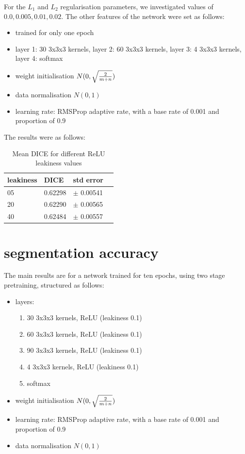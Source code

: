 \documentclass[msc]{infthesis}
\begin{document}
For the \(L_1\) and \(L_2\) regularisation parameters, we investigated values of \(0.0, 0.005, 0.01, 0.02\).
The other features of the network were set as follows:
\begin{itemize}
\item trained for only one epoch
\item layer 1: 30 3x3x3 kernels, layer 2: 60 3x3x3 kernels, layer 3: 4 3x3x3 kernels, layer 4: softmax
\item weight initialisation \(N(0, \sqrt{2 \over m + n})\)
\item data normalisation \(N(0, 1)\)
\item learning rate: RMSProp adaptive rate, with a base rate of 0.001 and proportion of 0.9
\end{itemize}
The results were as follows:
\begin{table}[ht]
  \centering
  \begin{tabular}[c]{llll}
    leakiness & DICE & std error \\
    \hline
    05 & 0.62298 & \(\pm\) 0.00541  \\
    20 & 0.62290 & \(\pm\) 0.00565  \\
    40 & 0.62484 & \(\pm\) 0.00557  \\
  \end{tabular}
  \caption{Mean DICE for different ReLU leakiness values}
\end{table}


\section{segmentation accuracy}

The main results are for a network trained for ten epochs, using two stage pretraining, structured as follows:
\begin{itemize}
\item layers:
  \begin{enumerate}
  \item 30 3x3x3 kernels, ReLU (leakiness 0.1)
  \item 60 3x3x3 kernels, ReLU (leakiness 0.1)
  \item 90 3x3x3 kernels, ReLU (leakiness 0.1)
  \item 4 3x3x3 kernels, ReLU (leakiness 0.1)
  \item softmax
  \end{enumerate}
\item weight initialisation \(N(0, \sqrt{2 \over m + n})\)
\item learning rate: RMSProp adaptive rate, with a base rate of 0.001 and proportion of 0.9
\item data normalisation \(N(0, 1)\)
\end{itemize}
\end{document}
